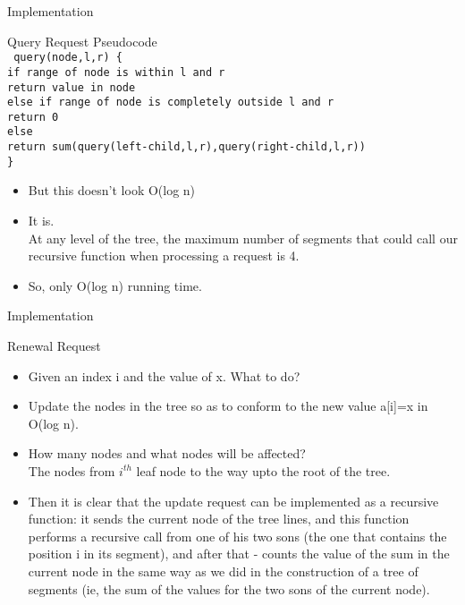 \documentclass{beamer}
\begin{document}
\begin{frame}[<+->]{Implementation}
\begin{block}{Query Request}
    Pseudocode\\
    \small{\texttt{
	query(node,l,r) \{\\
	\hspace{1mm} if range of node is within l and r\\
	    \hspace{3mm} return value in node\\
	\hspace{1mm} else if range of node is completely outside l and r\\
	    \hspace{3mm} return 0\\
	\hspace{1mm} else\\
	    \hspace{3mm} return sum(query(left-child,l,r),query(right-child,l,r))\\
	\}
	}}
    \begin{itemize}
    \item But this doesn't look O(log n)
    \item It is.\\
    At any level of the tree, the maximum number of segments that could call our recursive function when processing a request is 4.
    \item So, only O(log n) running time.
    \end{itemize}
\end{block}
\end{frame}

\begin{frame}[<+->]{Implementation}
\begin{block}{Renewal Request}
    \begin{itemize}
	\item Given an index i and the value of x. What to do?
	\item Update the nodes in the tree so as to conform to the new value a[i]=x in O(log n).
	\item How many nodes and what nodes will be affected?\\\pause
	The nodes from $i^{th}$ leaf node to the way upto the root of the tree.
	\item Then it is clear that the update request can be implemented as a recursive function: it sends the current node of the tree lines, and this function performs a recursive call from one of his two sons (the one that contains the position i in its segment), and after that - counts the value of the sum in the current node in the same way as we did in the construction of a tree of segments (ie, the sum of the values for the two sons of the current node).
    \end{itemize}
\end{block}
\end{frame}
\end{document}
